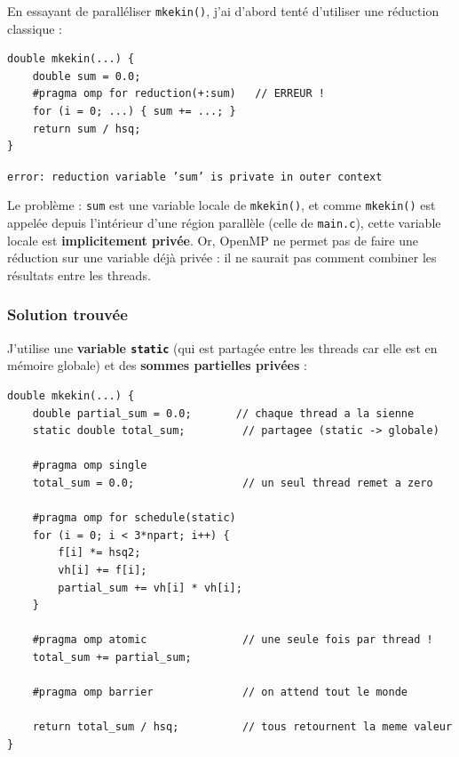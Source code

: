 \documentclass[12pt,a4paper]{article}
\begin{document}
En essayant de paralléliser \texttt{mkekin()}, j'ai d'abord tenté d'utiliser une réduction classique :

\begin{lstlisting}[title={\color{warnborder} Tentative qui echoue}]
double mkekin(...) {
    double sum = 0.0;
    #pragma omp for reduction(+:sum)   // ERREUR !
    for (i = 0; ...) { sum += ...; }
    return sum / hsq;
}
\end{lstlisting}

\begin{warnbox}
\texttt{error: reduction variable 'sum' is private in outer context}

Le problème : \texttt{sum} est une variable locale de \texttt{mkekin()}, et comme \texttt{mkekin()} est appelée depuis l'intérieur d'une région parallèle (celle de \texttt{main.c}), cette variable locale est \textbf{implicitement privée}. Or, OpenMP ne permet pas de faire une réduction sur une variable déjà privée : il ne saurait pas comment combiner les résultats entre les threads.
\end{warnbox}

\subsubsection{Solution trouvée}

J'utilise une \textbf{variable \texttt{static}} (qui est partagée entre les threads car elle est en mémoire globale) et des \textbf{sommes partielles privées} :

\begin{lstlisting}[title={\color{resultborder} Solution : variable static + sommes partielles + atomic}]
double mkekin(...) {
    double partial_sum = 0.0;       // chaque thread a la sienne
    static double total_sum;         // partagee (static -> globale)

    #pragma omp single
    total_sum = 0.0;                 // un seul thread remet a zero

    #pragma omp for schedule(static)
    for (i = 0; i < 3*npart; i++) {
        f[i] *= hsq2;
        vh[i] += f[i];
        partial_sum += vh[i] * vh[i];
    }

    #pragma omp atomic               // une seule fois par thread !
    total_sum += partial_sum;

    #pragma omp barrier              // on attend tout le monde

    return total_sum / hsq;          // tous retournent la meme valeur
}
\end{lstlisting}
\end{document}
